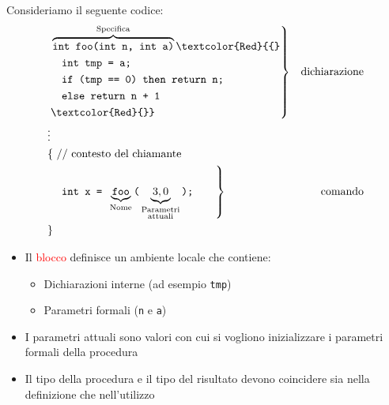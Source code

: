 \documentclass[a4paper]{article}
\begin{document}
\begin{example}
  Consideriamo il seguente codice:
  \[
    \begin{aligned}
      &\left.\begin{aligned}
        &\overbrace{\texttt{int foo(int n, int a)}}^{\text{Specifica}}
        \texttt{\textcolor{Red}{\{}}\\
        &\quad \texttt{int tmp = a;}\\
        &\quad \texttt{if (tmp == 0) then return n;}\\
        &\quad \texttt{else return n + 1 }\\
        &\texttt{\textcolor{Red}{\}}}
      \end{aligned}\right\} & \text{dichiarazione} \\
      &\vdots \\
      &\text{\{ // contesto del chiamante}\\
      &\left.\quad \texttt{int x = } \underbrace{\texttt{foo}}_{\text{Nome}} \texttt{(} \underbrace{3, 0}_{\substack{\text{Parametri}\\\text{attuali}}}
      \texttt{);}\qquad \right\} & \text{comando}\\
      &\text{\}}
    \end{aligned}
  \] 
  \begin{itemize}
    \item 
      Il \textcolor{Red}{blocco} definisce un ambiente locale che contiene:
      \begin{itemize}
        \item Dichiarazioni interne (ad esempio \texttt{tmp})
        \item Parametri formali (\texttt{n} e \texttt{a})
      \end{itemize}

    \item I parametri attuali sono valori con cui si vogliono inizializzare i parametri
      formali della procedura

    \item Il tipo della procedura e il tipo del risultato devono coincidere sia
      nella definizione che nell'utilizzo
  \end{itemize}
\end{example}
\end{document}
